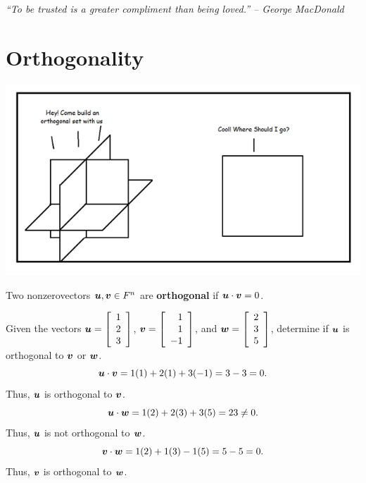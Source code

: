 \begin{center} 
\emph{``To be trusted is a greater compliment than being loved.'' -- George MacDonald}
\end{center}

\section{Orthogonality}\label{sec:ortho}
\centerline{\includegraphics[scale=0.75]{Chapter4/images/orthocomic.png}}
\begin{Def} Two nonzero\footnotemark[2] vectors $\boldsymbol u, \boldsymbol v\in F^n$ are \textbf{orthogonal} if $\boldsymbol u\cdot \boldsymbol v=0$.
\end{Def}\vs

\begin{Exam} Given the vectors $\boldsymbol u = \left[\begin{array}{r} 1\\2\\3 \end{array}\right]$, $\boldsymbol v= \left[\begin{array}{r} 1\\1\\-1 \end{array}\right]$, and $\boldsymbol w = \left[\begin{array}{r} 2\\3\\5 \end{array}\right]$, determine if $\boldsymbol u$ is orthogonal to $\boldsymbol v$ or $\boldsymbol w$.\\
\[\boldsymbol u \cdot \boldsymbol v = 1(1)+2(1)+3(-1) = 3-3 = 0.\] Thus, $\boldsymbol u$ is orthogonal to $\boldsymbol v$. 
\[\boldsymbol u \cdot \boldsymbol w = 1(2)+2(3)+3(5) = 23\neq 0.\] Thus, $\boldsymbol u$ is not orthogonal to $\boldsymbol w$.
\[\boldsymbol v \cdot \boldsymbol w = 1(2)+1(3)-1(5) = 5-5 = 0.\] Thus, $\boldsymbol v$ is orthogonal to $\boldsymbol w$. 
\end{Exam}\vs

